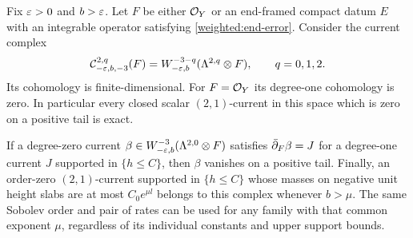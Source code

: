 \begin{theorem}
\label{weighted:currents}
Fix $\varepsilon>0$ and $b>\varepsilon$. Let $F$ be either $\mathcal O_Y$ or an end-framed
compact datum $E$ with an integrable operator satisfying
\eqref{weighted:end-error}. Consider the current complex
\begin{equation}\label{weighted:current-complex}
 \mathcal C^{2,q}_{-\varepsilon,b,-3}(F)
 =W^{-3-q}_{-\varepsilon,b}(\Lambda^{2,q}\otimes F),
 \qquad q=0,1,2.
\end{equation}
Its cohomology is finite-dimensional. For $F=\mathcal O_Y$ its degree-one
cohomology is zero. In particular every closed scalar $(2,1)$-current
in this space which is zero on a positive tail is exact.

If a degree-zero current
$\beta\in W^{-3}_{-\varepsilon,b}(\Lambda^{2,0}\otimes F)$ satisfies
$\bar\partial_F\beta=J$ for a degree-one current $J$ supported in
$\{h\le C\}$, then $\beta$ vanishes on a positive tail. Finally, an
order-zero $(2,1)$-current supported in $\{h\le C\}$ whose masses on
negative unit height slabs are at most $C_0e^{\mu l}$ belongs to this
complex whenever $b>\mu$. The same Sobolev order and pair of rates can
be used for any family with that common exponent $\mu$, regardless of
its individual constants and upper support bounds.
\end{theorem}

